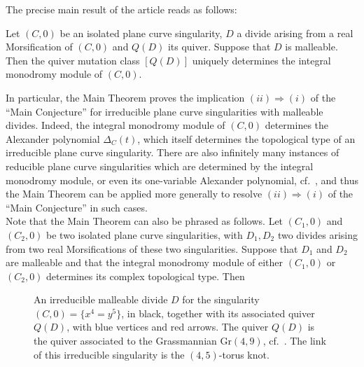 The precise main result of the article reads as follows:
\vspace{0.1cm}
\begin{fthm}\label{thm:main} Let \((C,0)\) be an isolated plane curve singularity, $D$ a divide arising from a real Morsification of $(C,0)$ and $Q(D)$ its quiver. Suppose that $D$ is malleable. Then the quiver mutation class $[Q(D)]$ uniquely determines the integral monodromy module of $(C,0)$.
\end{fthm}
\vspace{0.2cm}
In particular, the Main Theorem proves the implication $(ii)\Longrightarrow(i)$ of the ``Main Conjecture'' \cite[Conjecture 5.5]{FPST} for irreducible plane curve singularities with malleable divides. Indeed, the integral monodromy module of $(C,0)$ determines the Alexander polynomial $\Delta_C(t)$, which itself determines the topological type of an irreducible plane curve singularity. There are also infinitely many instances of reducible plane curve singularities which are determined by the integral monodromy module, or even its one-variable Alexander polynomial, cf.~, and thus the Main Theorem can be applied more generally to resolve $(ii)\Longrightarrow(i)$ of the ``Main Conjecture'' in such cases.\\

Note that the Main Theorem can also be phrased as follows. Let \((C_1,0)\) and \((C_2,0)\) be two isolated plane curve singularities, with $D_1,D_2$ two divides arising from two real Morsifications of these two singularities. Suppose that $D_1$ and $D_2$ are malleable and that the integral monodromy module of either \((C_1,0)\) or \((C_2,0)\) determines its complex topological type. Then\\
\begin{center}
\end{center}
\vspace{0.2cm}

\begin{figure}[htbp]
\centering

\scalebox{2}{\LissajousFiveFourQuiverPicture}

\caption{An irreducible malleable divide $D$ for the singularity $(C,0)=\{x^4=y^5\}$, in black, together with its
associated quiver $Q(D)$, with blue vertices and red arrows. The quiver $Q(D)$ is the quiver associated to the Grassmannian $\mbox{Gr}(4,9)$, cf.~\cite[Remark 16.2]{FPST}. The link of this irreducible singularity is the $(4,5)$-torus knot.}
\label{fig:divides-lissajous}
\end{figure}

